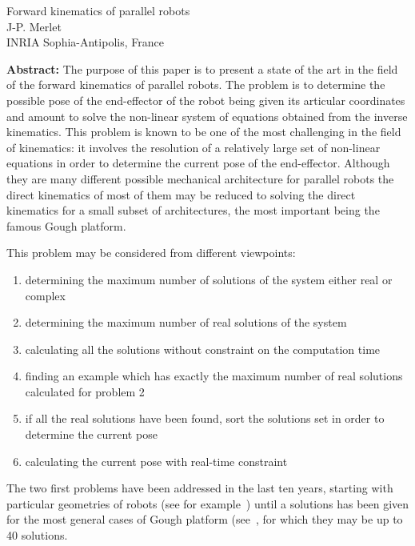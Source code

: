 
%

\begin{center}
Forward kinematics of parallel robots\\
J-P. Merlet\\
INRIA Sophia-Antipolis, France
\end{center}

\vspace{1cm}

{\bf Abstract:} The purpose of this paper is to present a state of the
art in the field of the forward kinematics of parallel robots.
The problem is to determine the possible pose of the end-effector of
the robot being given its articular coordinates and amount to solve
the non-linear system of equations obtained from the inverse
kinematics. This problem is known to be one of the most challenging in
the field of kinematics: it involves the resolution of a
relatively large set of non-linear equations in order to determine the
current pose of the end-effector. Although they are many different
possible mechanical architecture for parallel robots the direct
kinematics of most of them may be reduced to solving the direct
kinematics for a small subset of architectures, the most important
being the famous Gough platform.

This problem may be considered from different viewpoints:
\begin{enumerate}
\item determining the maximum number of solutions of the system either
real or complex
\item determining the maximum number of real solutions of the system
\item calculating all the solutions without constraint on the
computation time
\item finding an example which has exactly the maximum number of real
solutions calculated for problem 2
\item if all the real solutions have been found, sort the solutions
set in order to determine the current pose
\item calculating the current pose with real-time constraint
\end{enumerate}

The two first problems have been addressed in the last ten years,
starting with particular geometries of robots (see for
example~\cite{charentus89,griffis89,hunt78,nanua89,faugere95})
until a solutions
has been given for the most general cases of Gough platform
(see~\cite{lazard92,mourrain93,raghavan91,ronga92}, for which they may
be up to 40 solutions.

